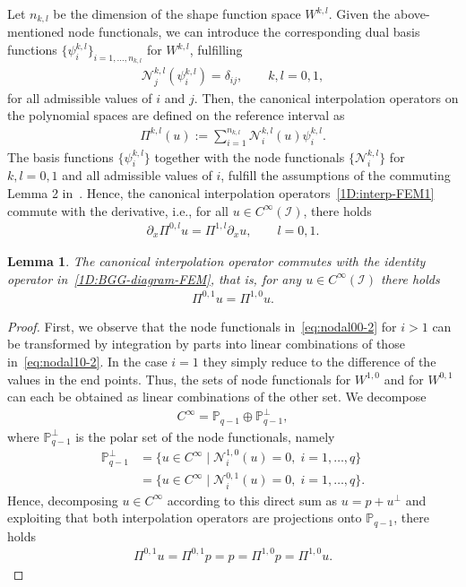 \documentclass[final]{amsart}%
\newtheorem{lemma}{Lemma}
\newcommand{\0}{\mathaccent23}
\newcommand{\nodal}{\mathcal N}
\newcommand{\interval}{\mathcal I}
\newcommand{\interp}{\Pi}
\begin{document}
Let $n_{k,l}$ be the dimension of the shape function space $W^{k,l}$.
Given the above-mentioned node functionals, we can introduce the corresponding dual basis functions $\{\psi^{k,l}_i\}_{i=1,\ldots,n_{k,l}}$ for $W^{k,l}$, fulfilling
\begin{gather}
  \label{eq:deltaij}
  \nodal^{k,l}_j(\psi^{k,l}_i)=\delta_{ij},
  \qquad k,l=0,1,
\end{gather}
for all admissible values of $i$ and $j$. Then, the canonical interpolation operators on the polynomial spaces are defined on the reference interval as
\begin{gather}
    \label{1D:interp-FEM1}
    \interp^{k,l}(u):=\sum_{i=1}^{n_{k,l}} \nodal^{k,l}_i(u)\psi^{k,l}_i.
\end{gather}
The basis functions $\{\psi^{k,l}_i\}$ together with the node functionals $\{\nodal^{k,l}_i\}$ for $k,l=0,1$ and all admissible values of $i$, fulfill the assumptions of the commuting Lemma 2 in~\cite{Bonizzoni-Kanschat2022}. Hence, the canonical interpolation operators~\eqref{1D:interp-FEM1} commute with the  derivative, i.e., for all $u \in C^\infty(\interval)$, there holds
\begin{gather*}
  \partial_x \interp^{0,l} u = \interp^{1,l} \partial_x u, \qquad l=0,1.
\end{gather*}
\begin{lemma}
\label{lem:proxy-interpolation}
The canonical interpolation operator commutes with the identity operator in~\eqref{1D:BGG-diagram-FEM}, that is, for any $u\in C^{\infty}(\interval)$ there holds
\begin{gather}
    \label{eq:fe-commute-canonical}
    \interp^{0,1} u = \interp^{1,0} u.
\end{gather}
\end{lemma}

\begin{proof}
First, we observe that the node functionals in~\eqref{eq:nodal00-2} for $i>1$ can be transformed by integration by parts into linear combinations of those in~\eqref{eq:nodal10-2}. In the case $i=1$ they simply reduce to the difference of the values in the end points.
Thus, the sets of node functionals for $W^{1,0}$ and for $W^{0,1}$ can each be obtained as linear combinations of the other set. We decompose
\begin{gather}
    C^\infty = \mathbb P_{q-1} \oplus \mathbb P_{q-1}^\perp,
\end{gather}
where $\mathbb P_{q-1}^\perp$ is the polar set of the node functionals, namely
\begin{align}
\mathbb P_{q-1}^\perp
  &= \bigl\{ u\in C^\infty \;\big|\;
  \nodal^{1,0}_i(u) = 0, \;i=1,\dots,q \}\\
  &= \bigl\{ u\in C^\infty \;\big|\;
  \nodal^{0,1}_i(u) = 0, \;i=1,\dots,q \}.
\end{align}
Hence, decomposing $u\in C^\infty$ according to this direct sum as $u=p+u^\perp$ and 
exploiting that both interpolation operators are projections onto $\mathbb P_{q-1}$, there holds
\begin{gather}
    \interp^{0,1} u = \interp^{0,1} p = p = \interp^{1,0} p = \interp^{1,0} u. 
\end{gather}
\end{proof}
\end{document}
